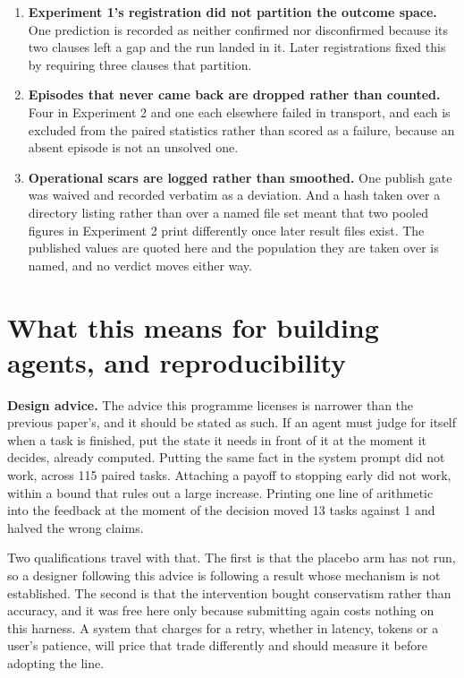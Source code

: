 \documentclass[11pt]{article}
\begin{document}
\begin{enumerate}
\item \textbf{Experiment 1's registration did not partition the outcome space.} One prediction is recorded as neither confirmed nor disconfirmed because its two clauses left a gap and the run landed in it. Later registrations fixed this by requiring three clauses that partition.

\item \textbf{Episodes that never came back are dropped rather than counted.} Four in Experiment 2 and one each elsewhere failed in transport, and each is excluded from the paired statistics rather than scored as a failure, because an absent episode is not an unsolved one.

\item \textbf{Operational scars are logged rather than smoothed.} One publish gate was waived and recorded verbatim as a deviation. And a hash taken over a directory listing rather than over a named file set meant that two pooled figures in Experiment 2 print differently once later result files exist. The published values are quoted here and the population they are taken over is named, and no verdict moves either way.

\end{enumerate}

\section{What this means for building agents, and reproducibility}

\textbf{Design advice.} The advice this programme licenses is narrower than the previous paper's, and it should be stated as such. If an agent must judge for itself when a task is finished, put the state it needs in front of it at the moment it decides, already computed. Putting the same fact in the system prompt did not work, across 115 paired tasks. Attaching a payoff to stopping early did not work, within a bound that rules out a large increase. Printing one line of arithmetic into the feedback at the moment of the decision moved 13 tasks against 1 and halved the wrong claims.

Two qualifications travel with that. The first is that the placebo arm has not run, so a designer following this advice is following a result whose mechanism is not established. The second is that the intervention bought conservatism rather than accuracy, and it was free here only because submitting again costs nothing on this harness. A system that charges for a retry, whether in latency, tokens or a user's patience, will price that trade differently and should measure it before adopting the line.
\end{document}
